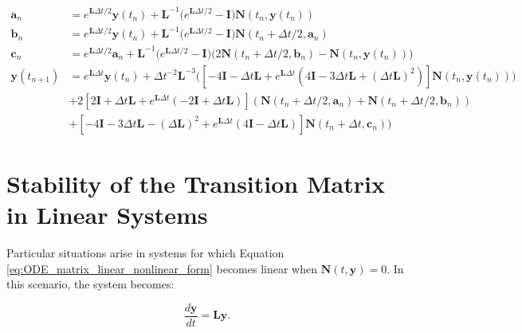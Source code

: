 \begin{equation}
\begin{split}
     \boldsymbol{a}_{n} &= e^{\boldsymbol{L}\Delta t/2}\boldsymbol{y}(t_{n}) + \boldsymbol{L}^{-1}\big(e^{\boldsymbol{L}\Delta t/2} - \boldsymbol{I} \big)\boldsymbol{N}(t_{n},\boldsymbol{y}(t_{n})) \\
    \boldsymbol{b}_{n} &= e^{\boldsymbol{L}\Delta t/2}\boldsymbol{y}(t_{n}) + \boldsymbol{L}^{-1}\big(e^{\boldsymbol{L}\Delta t/2} - \boldsymbol{I} \big)\boldsymbol{N}(t_{n}+\Delta t/2,\boldsymbol{a}_{n}) \\
     \boldsymbol{c}_{n} &= e^{\boldsymbol{L}\Delta t/2}\boldsymbol{a}_{n} + \boldsymbol{L}^{-1}\big(e^{\boldsymbol{L}\Delta t/2} - \boldsymbol{I} \big)\big(2\boldsymbol{N}(t_{n}+\Delta t/2,\boldsymbol{b} _{n}) - \boldsymbol{N}(t_{n},\boldsymbol{y}(t_{n}))\big) \\
     \boldsymbol{y}(t_{n+1}) &= e^{\boldsymbol{L}\Delta t}\boldsymbol{y}(t_{n}) + \Delta t^{-2}\boldsymbol{L}^{-3}\big([-4\boldsymbol{I} - \Delta t\boldsymbol{L} + e^{\boldsymbol{L}\Delta t}(4\boldsymbol{I} -3\Delta t\boldsymbol{L} + (\Delta t\boldsymbol{L})^{2})]\boldsymbol{N}(t_{n}, \boldsymbol{y}(t_{n}))) \\
     &+ 2[2\boldsymbol{I} + \Delta t\boldsymbol{L} + e^{\boldsymbol{L}\Delta t}(-2\boldsymbol{I} + \Delta t\boldsymbol{L})](\boldsymbol{N}(t_{n} + \Delta t/2, \boldsymbol{a}_{n}) + \boldsymbol{N}(t_{n} + \Delta t/2, \boldsymbol{b}_{n})) \\
     &+ [-4\boldsymbol{I} - 3\Delta t\boldsymbol{L} - (\Delta\boldsymbol{L})^{2} + e^{\boldsymbol{L}\Delta t}(4\boldsymbol{I} - \Delta t\boldsymbol{L})]\boldsymbol{N}(t_{n}+\Delta t, \boldsymbol{c}_{n})\big)
\end{split}
\end{equation}

\section{Stability of the Transition Matrix in Linear Systems}
Particular situations arise in systems for which Equation \ref{eq:ODE_matrix_linear_nonlinear_form} becomes linear when $\boldsymbol{N}(t,\boldsymbol{y}) = 0$. In this scenario, the system becomes:

\begin{equation}
    \frac{d\boldsymbol{y}}{dt} = \boldsymbol{L}\boldsymbol{y}.
\end{equation}

